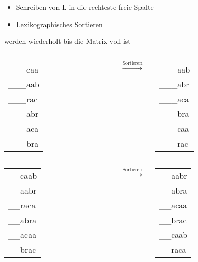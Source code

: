 \documentclass[14pt,xcolor=dvipsnames,pdftex]{beamer}
\begin{document}
\begin{frame}[allowframebreaks]
\begin{itemize}
 \begin{itemize}
  \item Schreiben von L in die rechteste freie Spalte
  \item Lexikographisches Sortieren
 \end{itemize}
 werden wiederholt bis die Matrix voll ist
\end{itemize}
\framebreak
\begin{columns}
 \begin{tabular}{T}
    \_\_\_{\color{red}c}aa\\
    \_\_\_{\color{red}a}ab\\
    \_\_\_{\color{red}r}ac\\
    \_\_\_{\color{red}a}br\\
    \_\_\_{\color{red}a}ca\\
    \_\_\_{\color{red}b}ra
  \end{tabular}
 $\xrightarrow{\text{Sortieren}}$
 \begin{tabular}{T}
    \_\_\_aab\\
    \_\_\_abr\\
    \_\_\_aca\\
    \_\_\_bra\\
    \_\_\_caa\\
    \_\_\_rac
  \end{tabular}
\end{columns}
\framebreak
\begin{columns}
 \begin{tabular}{T}
    \_\_{\color{red}c}aab\\
    \_\_{\color{red}a}abr\\
    \_\_{\color{red}r}aca\\
    \_\_{\color{red}a}bra\\
    \_\_{\color{red}a}caa\\
    \_\_{\color{red}b}rac
  \end{tabular}
 $\xrightarrow{\text{Sortieren}}$
 \begin{tabular}{T}
    \_\_aabr\\
    \_\_abra\\
    \_\_acaa\\
    \_\_brac\\
    \_\_caab\\
    \_\_raca
  \end{tabular}
\end{columns}

\end{frame}
\end{document}
